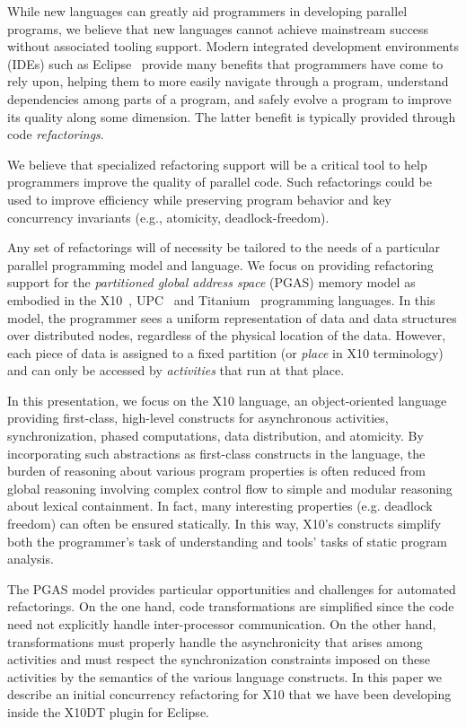 \documentclass[natbib]{sigplanconf}
\begin{document}
While new languages can greatly aid programmers in developing 
parallel programs, we believe that new languages cannot
achieve mainstream success without associated tooling support.
Modern integrated development environments
(IDEs) such as Eclipse~\cite{eclipse} provide many benefits that programmers
have come to rely upon, helping
them to more easily navigate through a program, understand
dependencies among parts of a program, and safely evolve a program to
improve its quality along some dimension.  The latter benefit is typically
provided through code {\em refactorings}.  

We believe that
specialized refactoring support will be a critical tool to help programmers improve the
quality of parallel code.  Such refactorings could be used
to improve efficiency while preserving program behavior and key
concurrency invariants (e.g., atomicity, deadlock-freedom).

Any set of refactorings will of necessity be tailored to the needs of a particular
parallel programming model and language.
We focus on providing refactoring support for the
\emph{partitioned global address space} (PGAS) memory model as
embodied in the X10~\cite{X10,Charles05}, UPC~\cite{ElGhazawi03} and
Titanium~\cite{Yelick98} programming languages.  In this model, the
programmer sees a uniform 
representation of data and data structures over distributed nodes, regardless
of the physical location of the data.  However, each piece of data is
assigned to a fixed partition (or {\em place} in X10 terminology)
and can only be accessed by {\em activities}
that run at that place.

In this presentation, we focus on the X10 language, an object-oriented language
providing first-class, high-level constructs for asynchronous activities, synchronization,
phased computations, data distribution, and atomicity.
By incorporating such abstractions as first-class constructs in the language,
the burden of reasoning about various program properties is often reduced
from global reasoning involving complex control flow to simple and modular
reasoning about lexical containment.
In fact, many interesting properties (e.g. deadlock freedom) can often
be ensured statically.
In this way, X10's constructs simplify both the programmer's task of
understanding and tools' tasks of static program analysis.

The PGAS model provides particular opportunities and challenges for
automated refactorings.  On the one hand, code transformations are
simplified since the code need not explicitly handle inter-processor
communication.  
On the other hand, transformations must properly handle the
asynchronicity that arises among activities and must respect
the synchronization constraints imposed on these activities by the
semantics of the various language constructs. 
In this paper we describe an initial concurrency
refactoring for X10 that we
have been developing inside the X10DT plugin for Eclipse.
\end{document}

